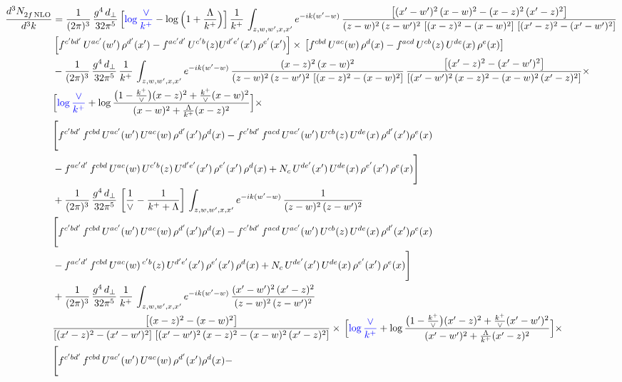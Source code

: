 \documentclass[9pt]{article}
\numberwithin{equation}{section}
\begin{document}
\begin{align}
    \frac{d^{3}N_{2f\,\rm NLO}^{\rm}}{d^{3}k}  & = \frac{1}{(2\pi)^{3}}\, \frac{g^{4}\,d_{\perp}}{32\pi^{5}}\,\Big[{\color{blue}\log\frac{\vee}{k^{+}}}-\log\Big(1+\frac{\Lambda}{k^{+}}\Big)\Big]\,\frac{1}{k^{+}}\,\int_{z,w,w^{\prime},x,x'} e^{-ik(w^{\prime}-w)}\,\frac{\left[(x'-w')^{2}\, (x-w)^{2} - (x-z)^{2}\, (x'-z)^{2}\right]}{(z-w)^{2}\, (z-w')^{2}\,\left[(x-z)^{2} - (x-w)^{2}\right]\, \left[(x'-z)^{2} - (x'-w')^{2}\right]}\notag \\ &   \left[f^{c'bd'}\, U^{ac'}(w')\,\rho^{d'}(x')-f^{ac'd'}\, U^{c'b}(z)U^{d'e'}(x')\, \rho^{e'}(x')\right]\times\, \left[f^{cbd}\, U^{ac}(w)\,\rho^{d}(x) - f^{acd}\, U^{cb}(z)\,U^{de}(x)\, \rho^{e}(x)\right] \notag \\ & - \frac{1}{(2\pi)^{3}}\, \frac{g^{4}\,d_{\perp}}{32\pi^{5}}\,\frac{1}{k^{+}}\,\int_{z,w,w^{\prime},x,x'} e^{-ik(w^{\prime}-w)}\,\frac{(x-z)^{2}\, (x-w)^{2}}{(z-w)^{2}\, (z-w')^{2}\,\left[(x-z)^{2} - (x-w)^{2}\right]}\,\frac{\left[(x'-z)^{2}-(x'-w')^{2}\right]}{\left[(x'-w')^{2}\, (x-z)^{2} - (x-w)^{2}\, (x'-z)^{2}\right]}\times\notag \\ & \Big[{\color{blue}\log\frac{\vee}{k^{+}}}+\log\frac{\big(1-\frac{k^{+}}{\vee}\big)(x-z)^{2}+\frac{k^{+}}{\vee}(x-w)^{2}}{(x-w)^{2}+\frac{\Lambda}{k^{+}}(x-z)^{2}}\Big]\times\notag \\ & \Bigg[f^{c'bd'}\,f^{cbd}\, U^{ac'}(w')\,U^{ac}(w)\,\rho^{d'}(x')\rho^{d}(x)- f^{c'bd'}\,f^{acd}\,U^{ac'}(w')\,U^{cb}(z)\,U^{de}(x)\,\rho^{d'}(x')\rho^{e}(x) \notag \\ & -f^{ac'd'}\,f^{cbd}\,U^{ac}(w)\,U^{c'b}(z)\,U^{d'e'}(x')\,\rho^{e'}(x')\,\rho^{d}(x) +N_{c}\,U^{de'}(x')\,U^{de}(x)\,\rho^{e'}(x')\,\rho^{e}(x)\Bigg] \notag \\ & + \frac{1}{(2\pi)^{3}}\, \frac{g^{4}\,d_{\perp}}{32\pi^{5}}\,\left[\frac{1}{\vee} - \frac{1}{k^{+} + \Lambda}\right]\,\int_{z,w,w^{\prime},x,x'} e^{-ik(w^{\prime}-w)}\,\frac{1}{(z-w)^{2}\, (z-w')^{2}}\notag \\ & \Bigg[f^{c'bd'}\,f^{cbd}\, U^{ac'}(w')\,U^{ac}(w)\,\rho^{d'}(x')\rho^{d}(x)- f^{c'bd'}\,f^{acd}\,U^{ac'}(w')\,U^{cb}(z)\,U^{de}(x)\,\rho^{d'}(x')\rho^{e}(x) \notag \\ & -f^{ac'd'}\,f^{cbd}\,U^{ac}(w)\,^{c'b}(z)\,U^{d'e'}(x')\,\rho^{e'}(x')\,\rho^{d}(x) +N_{c}\,U^{de'}(x')\,U^{de}(x)\,\rho^{e'}(x')\,\rho^{e}(x)\Bigg] \notag \\ & + \frac{1}{(2\pi)^{3}}\, \frac{g^{4}\,d_{\perp}}{32\pi^{5}}\,\frac{1}{k^{+}}\,\int_{z,w,w^{\prime},x,x'} e^{-ik(w^{\prime}-w)}\,\frac{(x'-w')^{2}\, (x'-z)^{2}}{(z-w)^{2}\, (z-w')^{2}}\notag \\ & \frac{\left[(x-z)^{2} - (x-w)^{2}\right]}{\left[(x'-z)^{2} - (x'-w')^{2}\right]\, \left[(x'-w')^{2}\, (x - z)^{2} - (x-w)^{2}\,(x'-z)^{2}\right]}\times\, \Big[{\color{blue}\log\frac{\vee}{k^{+}}}+\log\frac{\big(1-\frac{k^{+}}{\vee}\big)(x'-z)^{2}+\frac{k^{+}}{\vee}(x'-w')^{2}}{(x'-w')^{2}+\frac{\Lambda}{k^{+}}(x'-z)^{2}}\Big]\times \notag \\ &  \Bigg[f^{c'bd'}\,f^{cbd}\, U^{ac'}(w')\,U^{ac}(w)\,\rho^{d'}(x')\rho^{d}(x)- 
\end{align}
\end{document}
